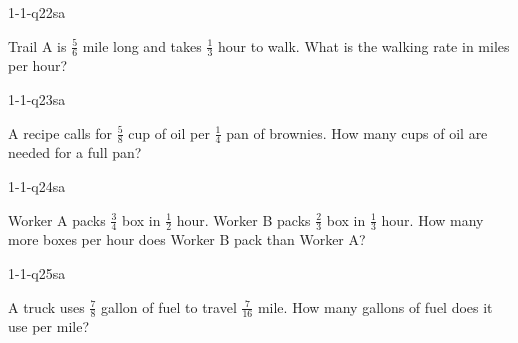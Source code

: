 \begin{practiceQuestion}{1-1-q22}{sa}
\begin{questionText}
Trail A is $\frac{5}{6}$ mile long and takes $\frac{1}{3}$ hour to walk. What is the walking rate in miles per hour?
\end{questionText}
\end{practiceQuestion}

\begin{practiceQuestion}{1-1-q23}{sa}
\begin{questionText}
A recipe calls for $\frac{5}{8}$ cup of oil per $\frac{1}{4}$ pan of brownies. How many cups of oil are needed for a full pan?
\end{questionText}
\end{practiceQuestion}

\begin{practiceQuestion}{1-1-q24}{sa}
\begin{questionText}
Worker A packs $\frac{3}{4}$ box in $\frac{1}{2}$ hour. Worker B packs $\frac{2}{3}$ box in $\frac{1}{3}$ hour. How many more boxes per hour does Worker B pack than Worker A?
\end{questionText}
\end{practiceQuestion}

\begin{practiceQuestion}{1-1-q25}{sa}
\begin{questionText}
A truck uses $\frac{7}{8}$ gallon of fuel to travel $\frac{7}{16}$ mile. How many gallons of fuel does it use per mile?
\end{questionText}
\end{practiceQuestion}


